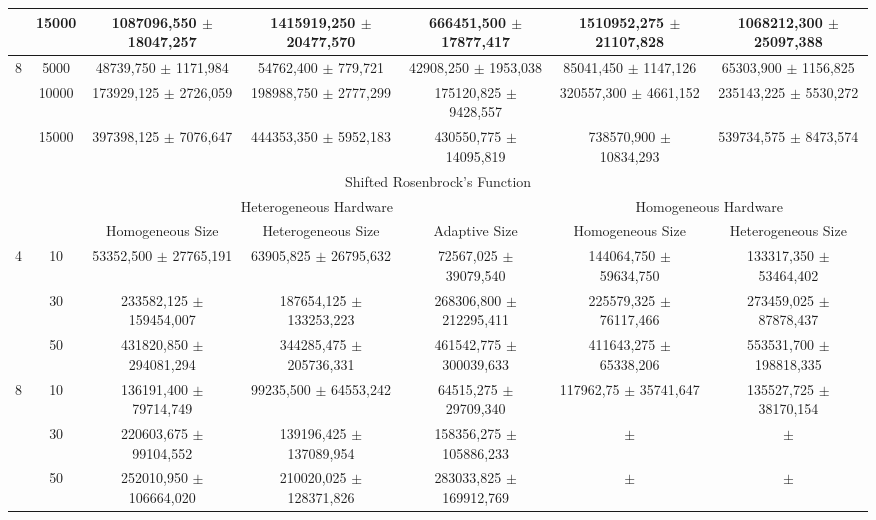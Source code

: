 \documentclass[final,1p,times]{elsarticle}
\begin{document}
\begin{table}
{\begin{tabular}{|c|c|c|c|c|c|c|}
	&	15000	&	1087096,550	$\pm$	18047,257	&	1415919,250	$\pm$	20477,570	&	666451,500	$\pm$	17877,417	&	1510952,275	$\pm$	21107,828	&	1068212,300	$\pm$	25097,388	\\ \hline
8	&	5000	&	48739,750	$\pm$	1171,984	&	54762,400	$\pm$	779,721		&	42908,250	$\pm$	1953,038	&	85041,450	$\pm$	1147,126	&	65303,900	$\pm$	1156,825	\\ \hline
	&	10000	&	173929,125	$\pm$	2726,059	&	198988,750	$\pm$	2777,299	&	175120,825	$\pm$	9428,557	&	320557,300	$\pm$	4661,152	&	235143,225	$\pm$	5530,272	\\ \hline
	&	15000	&	397398,125	$\pm$	7076,647	&	444353,350	$\pm$	5952,183	&	430550,775	$\pm$	14095,819	&	738570,900	$\pm$	10834,293	&	539734,575	$\pm$	8473,574	\\ \hline
				\multicolumn{7}{|c|}{Shifted Rosenbrock's Function}																							\\ \hline
\multicolumn{2}{|c|}{}	&	\multicolumn{3}{|c|}{Heterogeneous Hardware}												& \multicolumn{2}{|c|}{Homogeneous Hardware}							\\ \hline				
\multicolumn{2}{|c|}{}	&	Homogeneous Size			&	Heterogeneous Size			&	Adaptive Size				& Homogeneous Size				& Heterogeneous Size				\\ \hline
4	&	10	&	53352,500	$\pm$	27765,191	&	63905,825	$\pm$	26795,632	&	72567,025	$\pm$	39079,540	&	144064,750	$\pm$	59634,750	&	133317,350	$\pm$	53464,402	\\ \hline
	&	30	&	233582,125	$\pm$	159454,007	&	187654,125	$\pm$	133253,223	&	268306,800	$\pm$	212295,411	&	225579,325	$\pm$	76117,466	&	273459,025	$\pm$	87878,437	\\ \hline
	&	50	&	431820,850	$\pm$	294081,294	&	344285,475	$\pm$	205736,331	&	461542,775	$\pm$	300039,633	&	411643,275	$\pm$	65338,206	&	553531,700	$\pm$	198818,335	\\ \hline
8	&	10	&	136191,400	$\pm$	79714,749	&	99235,500	$\pm$	64553,242	&	64515,275	$\pm$	29709,340	&	117962,75	$\pm$	35741,647	&	135527,725	$\pm$	38170,154	\\ \hline
	&	30	&	220603,675	$\pm$	99104,552	&	139196,425	$\pm$	137089,954	&	158356,275	$\pm$	105886,233	&		$\pm$		&		$\pm$		\\ \hline
	&	50	&	252010,950	$\pm$	106664,020	&	210020,025	$\pm$	128371,826	&	283033,825	$\pm$	169912,769	&		$\pm$		&		$\pm$		\\ \hline
\end{tabular}
}
\label{tab:resultsTIMEall}
\end{table}
\end{document}

